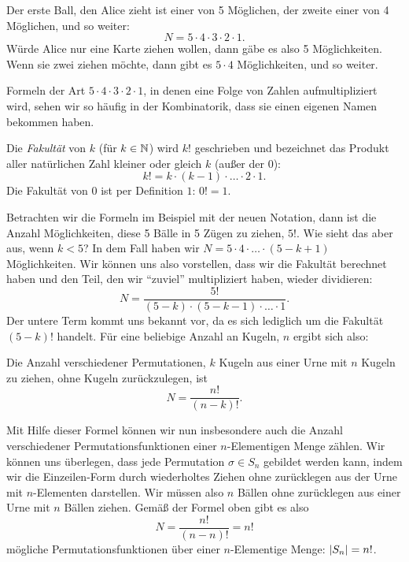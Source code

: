 \documentclass[../../main.tex]{subfiles}
\begin{document}
\begin{example}{}
        Der erste Ball, den Alice zieht ist einer von 5 Möglichen, der zweite einer von 4 Möglichen, und so weiter:
        $$N = 5\cdot 4 \cdot 3 \cdot 2 \cdot 1.$$
        Würde Alice nur eine Karte ziehen wollen, dann gäbe es also 5 Möglichkeiten. Wenn sie zwei ziehen möchte, dann gibt es $5\cdot 4$ Möglichkeiten, und so weiter.
    \end{example}
    
    Formeln der Art $5\cdot 4\cdot 3\cdot 2\cdot 1$, in denen eine Folge von Zahlen aufmultipliziert wird, sehen wir so häufig in der Kombinatorik, dass sie einen eigenen Namen bekommen haben.
    
    \begin{definition}
        Die \emph{Fakultät} von $k$ (für $k\in\mathbb{N}$) wird $k!$ geschrieben und bezeichnet das Produkt aller natürlichen Zahl kleiner oder gleich $k$ (außer der 0):
        $$k! = k\cdot (k-1) \cdot \ldots \cdot 2 \cdot 1.$$
        Die Fakultät von $0$ ist per Definition $1$: $0! = 1$.
    \end{definition}
    
    Betrachten wir die Formeln im Beispiel mit der neuen Notation, dann ist die Anzahl Möglichkeiten, diese 5 Bälle in 5 Zügen zu ziehen, $5!$. Wie sieht das aber aus, wenn $k < 5$? In dem Fall haben wir $N = 5\cdot 4 \cdot \ldots \cdot (5-k+1)$ Möglichkeiten. Wir können uns also vorstellen, dass wir die Fakultät berechnet haben und den Teil, den wir \enquote{zuviel} multipliziert haben, wieder dividieren:
    $$N = \frac{5!}{(5-k) \cdot (5-k-1) \cdot \ldots \cdot 1}.$$
    Der untere Term kommt uns bekannt vor, da es sich lediglich um die Fakultät $(5-k)!$ handelt. Für eine beliebige Anzahl an Kugeln, $n$ ergibt sich also:
    \begin{lemma}
        Die Anzahl verschiedener Permutationen, $k$ Kugeln aus einer Urne mit $n$ Kugeln zu ziehen, ohne Kugeln zurückzulegen, ist $$N = \frac{n!}{(n-k)!}.$$
    \end{lemma}
    
    Mit Hilfe dieser Formel können wir nun insbesondere auch die Anzahl verschiedener Permutationsfunktionen einer $n$-Elementigen Menge zählen. Wir können uns überlegen, dass jede Permutation $\sigma \in S_n$ gebildet werden kann, indem wir die Einzeilen-Form durch wiederholtes Ziehen ohne zurücklegen aus der Urne mit $n$-Elementen darstellen. Wir müssen also $n$ Bällen ohne zurücklegen aus einer Urne mit $n$ Bällen ziehen. Gemäß der Formel oben gibt es also
    $$N = \frac{n!}{(n-n)!} = n!$$
    mögliche Permutationsfunktionen über einer $n$-Elementige Menge: $\lvert S_n\rvert = n!$.
    
\end{document}
